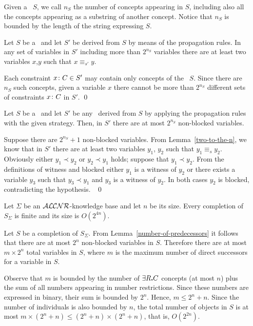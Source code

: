 Given a \cs\ $S$, we call  $n_S$ the number of concepts appearing in
$S$, including also all the concepts appearing as a substring of another
concept. Notice that $n_S$ is bounded by the length
of the string expressing $S$.

\begin{lemma}\label{two-to-the-n}
Let $S$ be a \cs\ and let 
$S'$ be derived from $S$ by means of the propagation rules.
In any set of variables in $S'$ including more than $2^{n_S}$ 
variables there are at
least two variables $x$,$y$ such that $x \equiv_{s'} y$.
\end{lemma} 
\proof 
Each constraint $x\colon C \in S'$ may contain only concepts of the
\cs\ $S$. Since there are $n_S$ such concepts, given a variable
$x$ there cannot be more than $2^{n_S}$ different sets of constraints
$x\colon C$ in $S'$.
\qed

\begin{lemma}\label{number-of-predecessors}
Let $S$ be a \cs\ and
let $S'$ be any \cs\ derived from $S$ by applying the propagation rules with the
given strategy. Then, in $S'$ there are at most $2^{n_S}$ non-blocked
variables.   
\end{lemma}
\proof
Suppose there are  $2^{n_S}+1$ non-blocked variables. From
Lemma~\ref{two-to-the-n},  we know that in $S'$ there are at least 
two variables $y_1$,
$y_2$ such that $y_1 \equiv_s y_2$. 
Obviously either $y_1\prec y_2$ or $y_2\prec y_1$
holds; suppose that  $y_1\prec y_2$.
From the definitions of witness and blocked either $y_1$ is a witness of $y_2$ or
there exists a variable $y_3$ such that $y_3\prec y_1$ and $y_3$ is a witness
of $y_2$. In both cases $y_2$ is blocked, contradicting the hypothesis. 
\mbox{ }\qed

\begin{theorem} \label{termination}
Let $\Sigma$  be an 
${\cal ALCNR}$-knowledge base and let $n$ be its size. Every
completion of $S_{\Sigma}$ is finite and its size is  $O(2^{4n})$.
\end{theorem}
\proof
Let $S$ be a completion of $S_{\Sigma}$. From Lemma~\ref{number-of-predecessors} it
follows that there are at most $2^n$ non-blocked variables in $S$. Therefore
there are at most $m\times 2^n$ total variables in $S$, where $m$ is the maximum
number of direct successors for a variable in $S$. 

Observe that $m$ is bounded by the
number of $\exists R \mbox{\bf .} C$ concepts (at most $n$) plus the sum of all numbers 
appearing in number restrictions. Since these numbers are expressed in binary,
their sum is bounded by $2^n$. Hence, $m \leq 2^n + n$.
Since the number of
individuals is also bounded by  $n$, the total number of objects
in $S$ is at most $m\times(2^n + n) \le (2^n + n)\times(2^n + n)$, that is,
$O(2^{2n})$.

